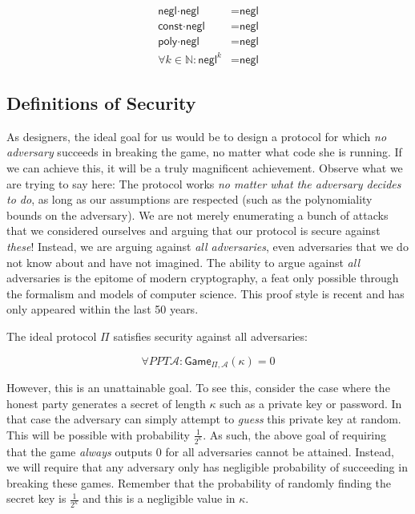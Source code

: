 \begin{align*}
  \textsf{negl} \cdot \textsf{negl} &= \textsf{negl}\\
  \textsf{const} \cdot \textsf{negl} &= \textsf{negl}\\
  \textsf{poly} \cdot \textsf{negl} &= \textsf{negl}\\
  \forall k \in \mathbb{N}: \textsf{negl}^k &= \textsf{negl}
\end{align*}

\subsection*{Definitions of Security}

As designers, the ideal goal for us would be to design a protocol for which \emph{no adversary}
succeeds in breaking the game, no matter what code she is running. If we can achieve this, it
will be a truly magnificent achievement. Observe what we are trying to say here: The protocol
works \emph{no matter what the adversary decides to do}, as long as our assumptions are respected
(such as the polynomiality bounds on the adversary).
We are not merely enumerating a bunch of attacks that we considered ourselves and arguing that
our protocol is secure against \emph{these}!
Instead, we are arguing against \emph{all adversaries}, even adversaries that we do
not know about and have not imagined. The ability to argue against \emph{all} adversaries is the
epitome of modern cryptography, a feat only possible through the
formalism and models of computer science. This proof style is recent and has only appeared within
the last 50 years.

The ideal protocol $\Pi$ satisfies security against all adversaries:

\[
  \forall PPT \mathcal{A}: \textsf{Game}_{\Pi,\mathcal{A}}(\kappa) = 0
\]

However, this is an unattainable goal. To see this, consider the case where the honest party
generates a secret of length $\kappa$ such as a private key or password. In that case the
adversary can simply attempt to \emph{guess} this private key at random. This will be possible
with probability $\frac{1}{2^\kappa}$. As such, the above goal of requiring that the game
\emph{always} outputs $0$ for all adversaries cannot be attained. Instead, we will require
that any adversary only has negligible probability of succeeding in breaking these games.
Remember that the probability of randomly finding the secret key is $\frac{1}{2^\kappa}$
and this is a negligible value in $\kappa$.

